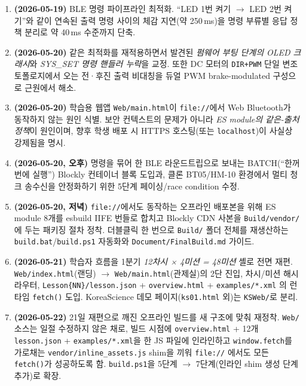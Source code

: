 \documentclass[11pt, oneside]{article}
\begin{document}
\begin{enumerate}
  \item \textbf{(2026-05-19)} BLE 명령 파이프라인 최적화. ``LED 1번 켜기
        $\rightarrow$ LED 2번 켜기''와 같이 연속된 출력 명령 사이의
        체감 지연(약 250\,ms)을 명령 부류별 응답 정책 분리로 약 40\,ms
        수준까지 단축.
  \item \textbf{(2026-05-20)} 같은 최적화를 재적용하면서 발견된 \emph{펌웨어
        부팅 단계의 OLED 크래시}와 \emph{SYS\_SET 명령 핸들러 누락}을
        교정. 또한 DC 모터의 \texttt{DIR+PWM} 단일 변조 토폴로지에서
        오는 전·후진 출력 비대칭을 듀얼 PWM brake-modulated 구성으로
        근원에서 해소.
  \item \textbf{(2026-05-20)} 학습용 웹앱 \texttt{Web/main.html}이
        \texttt{file://}에서 Web Bluetooth가 동작하지 않는 원인 식별.
        보안 컨텍스트의 문제가 아니라 \emph{ES module의 같은-출처
        정책}이 원인이며, 향후 학생 배포 시 HTTPS 호스팅(또는
        \texttt{localhost})이 사실상 강제됨을 명시.
  \item \textbf{(2026-05-20, 오후)} 명령을 묶어 한 BLE 라운드트립으로
        보내는 BATCH(``한꺼번에 실행'') Blockly 컨테이너 블록 도입과,
        클론 BT05/HM-10 환경에서 멀티 청크 송수신을 안정화하기 위한
        5단계 페이싱/race condition 수정.
  \item \textbf{(2026-05-20, 저녁)} \texttt{file://}에서도 동작하는
        오프라인 배포본을 위해 ES module 8개를 esbuild IIFE 번들로
        합치고 Blockly CDN 사본을 \texttt{Build/vendor/}에 두는
        패키징 절차 정착. 더블클릭 한 번으로 \texttt{Build/} 폴더
        전체를 재생산하는 \texttt{build.bat}/\texttt{build.ps1}
        자동화와 \texttt{Document/FinalBuild.md} 가이드.
  \item \textbf{(2026-05-21)} 학습자 흐름을 1분기 \emph{12차시 × 4미션 =
        48미션} 셸로 전면 재편. \texttt{Web/index.html}(랜딩)
        $\to$ \texttt{Web/main.html}(관제실)의 2단 진입, 차시/미션
        해시 라우터, \texttt{Lesson\{NN\}/lesson.json} + \texttt{overview.html}
        + \texttt{examples/*.xml} 의 런타임 \texttt{fetch()} 도입.
        KoreaScience 데모 페이지(\texttt{ks01.html} 외)는 \texttt{KSWeb/}로
        분리.
  \item \textbf{(2026-05-22)} 21일 재편으로 깨진 오프라인 빌드를
        새 구조에 맞춰 재정착. \texttt{Web/} 소스는 일절 수정하지 않은
        채로, 빌드 시점에 \texttt{overview.html} + 12개 \texttt{lesson.json}
        + \texttt{examples/*.xml}을 한 JS 파일에 인라인하고 \texttt{window.fetch}를
        가로채는 \texttt{vendor/inline\_assets.js} shim을 끼워 \texttt{file://}
        에서도 모든 \texttt{fetch()}가 성공하도록 함. \texttt{build.ps1}을
        5단계 $\to$ 7단계(인라인 shim 생성 단계 추가)로 확장.
\end{enumerate}
\end{document}

